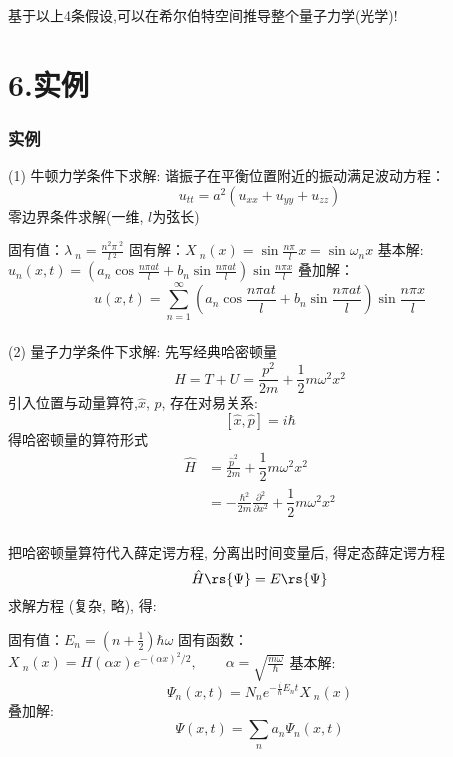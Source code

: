 \begin{frame}
    \frametitle{}
    基于以上4条假设,可以在希尔伯特空间推导整个量子力学(光学)! \\ 

\end{frame}

\section{6.实例}

\begin{frame}
    \frametitle{实例}
    \例 [10. 求解一维谐振子]{}
    \解 (1) 牛顿力学条件下求解: 谐振子在平衡位置附近的振动满足波动方程：
    \begin{equation*}
        u_{tt}=a^2(u_{xx}+ u_{yy}+u_{zz})
    \end{equation*}
    零边界条件求解(一维, $l$为弦长)
    \begin{enumerate}
        \IItem 固有值：$\displaystyle  \lambda~_n=\frac{n^2\pi~^2}{l~^2}$ 
        \IItem 固有解：{$\displaystyle  X~_n(x)=\sin \frac{n\pi~}{l} x=\sin \omega_n x $}
        \IItem 基本解:
        $\displaystyle u_n(x,t) = (a_n\cos\frac{ n\pi at}{l}+ b_n\sin \frac{ n\pi at}{l}) \sin \frac{ n\pi x}{l} $ 
        \IItem 叠加解：
        \[u(x,t) = \sum\limits_{n=1}^{\infty }  (a_n\cos\frac{ n\pi at}{l}+ b_n\sin \frac{ n\pi at}{l}) \sin \frac{ n\pi x}{l}\]
    \end{enumerate}
\end{frame}

\begin{frame}
    \frametitle{}
    \解 (2) 量子力学条件下求解: 先写经典哈密顿量
      \begin{equation*}
          H=T+U = \frac{p^2 }{2m} + \dfrac{1}{2} m \omega ^2 x^2 
      \end{equation*}	
      引入位置与动量算符,$\hat{x}$, $\hat{p}$, 存在对易关系:
      \[ [\hat{x}, \hat{p}] =i\hbar\] 
      得哈密顿量的算符形式
      \begin{equation*}
      \begin{aligned}
          \hat{H} &= \frac{\hat{p}^2 }{2m} + \dfrac{1}{2} m \omega ^2 x^2  \\
                 &= - \frac{\hbar ^2}{2m} \frac{\partial^2 }{\partial x^2 }+ \dfrac{1}{2} m \omega ^2 x^2   
      \end{aligned}
      \end{equation*}	
\end{frame}

\begin{frame}
    \frametitle{}
    把哈密顿量算符代入薛定谔方程, 分离出时间变量后, 得定态薛定谔方程
    \[ \hat{H}\rs{\Psi} =E \rs{\Psi} \]
    求解方程 (复杂, 略), 得: 
    \begin{enumerate}
      \IItem 固有值：$\displaystyle  E_n=(n+\frac{1}{2})\hbar \omega $ 
      \IItem 固有函数：{$\displaystyle  X~_n(x)= H(\alpha x) e^{-(\alpha x)^2 /2 }, \qquad \alpha =\sqrt{\frac{m \omega }{\hbar}} $}
      \IItem 基本解:
      \[ \Psi_n(x,t) = N_n e^{-\frac{i}{\hbar} E_n t } X~_n(x)\]  
      \IItem 叠加解:
      \[ \Psi (x,t) = \sum_n a_n \Psi_n(x,t)\] 
  \end{enumerate}
\end{frame}


